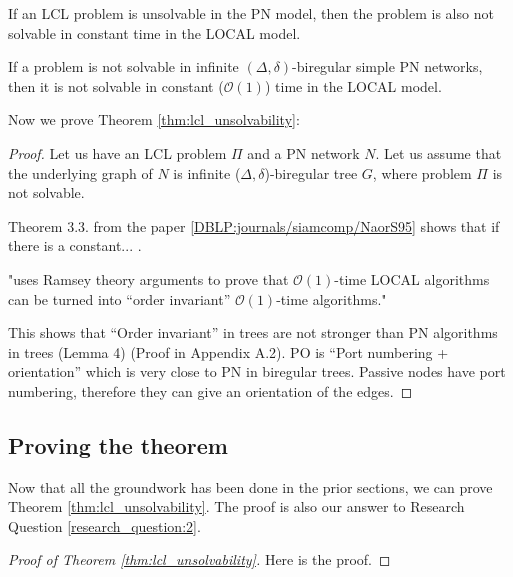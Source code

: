\begin{theorem} \label{thm:lcl_unsolvability}
    If an LCL problem is unsolvable in the PN model, then the problem is also not solvable in constant time in the LOCAL model.
\end{theorem}

\begin{lemma} \label{lem:lcl_unsolvability:5}
    If a problem is not solvable in infinite $(\Delta, \delta)$-biregular simple PN networks, then it is not solvable in constant ($\mathcal{O}(1)$) time in the LOCAL model.
\end{lemma}

Now we prove Theorem \ref{thm:lcl_unsolvability}:
\begin{proof}

    Let us have an LCL problem $\Pi$ and a PN network $N$.
    Let us assume that the underlying graph of $N$ is infinite ($\Delta, \delta$)-biregular tree $G$, where problem $\Pi$ is not solvable.

    Theorem 3.3. from the paper \ref{DBLP:journals/siamcomp/NaorS95} shows that if there is a constant... \todo{}.

    \cite{DBLP:journals/siamcomp/NaorS95} "uses Ramsey theory arguments to prove that $\mathcal{O}(1)$-time LOCAL algorithms can be turned into ``order invariant'' $\mathcal{O}(1)$-time algorithms."

    This \cite{DBLP:journals/dc/GoosHS17} shows that ``Order invariant'' in trees are not stronger than PN algorithms in trees (Lemma 4) (Proof in Appendix A.2). PO is ``Port numbering + orientation'' which is very close to PN in biregular trees. Passive nodes have port numbering, therefore they can give an orientation of the edges.

\end{proof}


\subsection{Proving the theorem} \label{sec:algorithm:prooving_the_theorem}
Now that all the groundwork has been done in the prior sections, we can prove Theorem \ref{thm:lcl_unsolvability}.
The proof is also our answer to Research Question \ref{research_question:2}.
\begin{proof}[Proof of Theorem \ref{thm:lcl_unsolvability}]
    Here is the proof.
    \todo{}
\end{proof}

